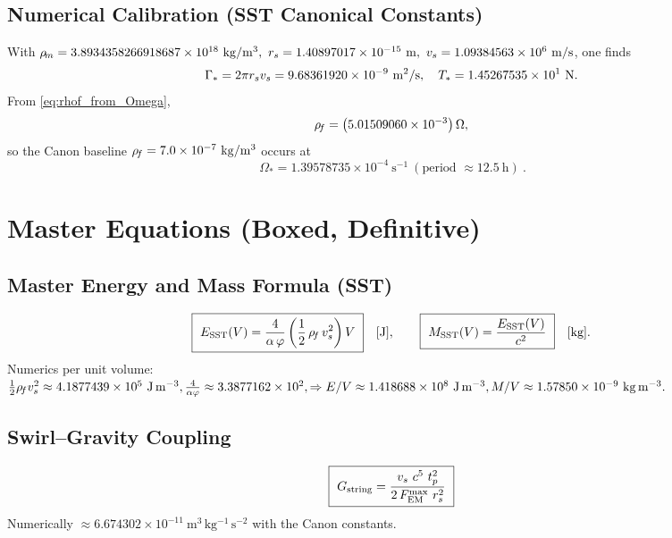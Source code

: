 \documentclass[11pt]{article}
\begin{document}
    \subsection{Numerical Calibration (SST Canonical Constants)}
    With
    \(
    \rhom=3.8934358266918687\times10^{18}\ \mathrm{kg/m^3},\
    \rs=1.40897017\times10^{-15}\ \mathrm{m},\
    \vscore=1.09384563\times10^{6}\ \mathrm{m/s}
    \),
    one finds
    \[
        \Gamma_\ast = 2\pi r_s v_s
        = 9.68361920\times10^{-9}\ \mathrm{m^2/s},\quad
        T_\ast = 1.45267535\times10^{1}\ \mathrm{N}.
    \]
    From \eqref{eq:rhof_from_Omega},
    \[
        \rho_{\!f} = \bigl(5.01509060\times10^{-3}\bigr)\,\Omega,
    \]
    so the Canon baseline \( \rhof=7.0\times10^{-7}\ \mathrm{kg/m^3}\) occurs at
    \[
        \boxed{\ \Omega_\ast = 1.39578735\times10^{-4}\ \mathrm{s^{-1}}\ (\text{period } \approx 12.5\ \mathrm{h})\ }.
    \]

    \section{Master Equations (Boxed, Definitive)}

    \subsection{Master Energy and Mass Formula (SST)}
    \[
        \boxed{\ E_{\text{SST}}(V) = \frac{4}{\alpha\,\varphi} \left( \frac{1}{2}\,\rhof\,\vscore^{2} \right) V\ }\quad [\text{J}],
        \qquad
        \boxed{\ M_{\text{SST}}(V) = \frac{E_{\text{SST}}(V)}{c^{2}} \ }\quad [\text{kg}].
    \]
    Numerics per unit volume:
    \(
    \tfrac12\rho_{\!f} v_s^2 \approx 4.1877439\times10^{5}\ \mathrm{J\,m^{-3}},
    \frac{4}{\alpha\varphi} \approx 3.3877162\times10^{2},
    \Rightarrow E/V \approx 1.418688\times10^{8}\ \mathrm{J\,m^{-3}},
    M/V \approx 1.57850\times10^{-9}\ \mathrm{kg\,m^{-3}}.
    \)

    \subsection{Swirl–Gravity Coupling}
    \[
        \boxed{\ G_{\text{string}} = \frac{\vscore\ c^{5}\ t_p^{2}}{2\,F_{\text{EM}}^{\max}\ \rs^{2}} \ }
    \]
    Numerically \( \approx 6.674302\times10^{-11}\ \mathrm{m^3\,kg^{-1}\,s^{-2}}\) with the Canon constants.
\end{document}
